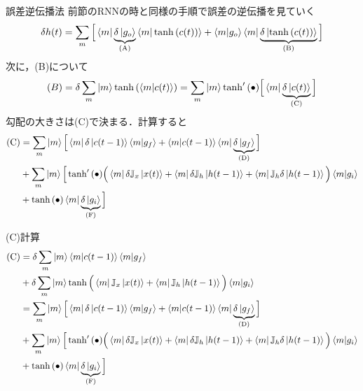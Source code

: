 \documentclass[dvipdfmx,8pt]{beamer}
\begin{document}
  \begin{frame}[t]{誤差逆伝播法}
    前節のRNNの時と同様の手順で誤差の逆伝播を見ていく\\
    \begin{equation*}
      \delta{h(t)} = \sum_{m}\Big[ \bra{m}\underbrace{\delta\ket{g_o}}_{\text{(A)}}\braket{m|\tanh{(c(t))}} + \braket{m|g_o}\bra{m}\underbrace{\delta \ket{\tanh{(c(t))}}}_{\text{(B)}} \Big]
    \end{equation*}
    次に，(B)について
    \begin{equation*}
      (B) = \delta\sum_{m}\ket{m}\tanh{(\braket{m|c(t)})} = \sum_{m}\ket{m}\tanh'{(\bullet)}\Big[ \bra{m}\underbrace{\delta\ket{c(t)}}_{\text{(C)}}  \Big]
    \end{equation*}
    勾配の大きさは(C)で決まる．計算すると
    \begin{align*}
      \text{(C)} 
      &= \sum_{m} \ket{m} \Big[ \bra{m}\delta\ket{c(t-1)}\braket{m|g_f} + \braket{m|c(t-1)}\bra{m}\underbrace{\delta\ket{g_f}}_{\text{(D)}} \Big]\\
      &+ \sum_{m} \ket{m}\Big[ \tanh'{(\bullet)}\Big( \bra{m}\delta\mathbb{J}_x\ket{x(t)} + \bra{m}\delta\mathbb{J}_h\ket{h(t-1)} + \bra{m}\mathbb{J}_h \delta\ket{h(t-1)} \Big)\braket{m|g_i}\\
      &+ \tanh{(\bullet)}\bra{m}\underbrace{\delta\ket{g_i}}_{\text{(F)}} \Big]
    \end{align*}
  \end{frame}

  \begin{frame}{(C)計算}
    \begin{align*}
      \text{(C)} 
      &= \delta\sum_{m}\ket{m}\braket{m|c(t-1)}\braket{m|g_f}\\
      &+ \delta\sum_m \ket{m}\tanh{\Big( \bra{m}\mathbb{J}_x \ket{x(t)} + \bra{m}\mathbb{J}_h \ket{h(t-1)} \Big)}\braket{m|g_i}\\ 
      &= \sum_{m} \ket{m} \Big[ \bra{m}\delta\ket{c(t-1)}\braket{m|g_f} + \braket{m|c(t-1)}\bra{m}\underbrace{\delta\ket{g_f}}_{\text{(D)}} \Big]\\
      &+ \sum_{m} \ket{m}\Big[ \tanh'{(\bullet)}\Big( \bra{m}\delta\mathbb{J}_x\ket{x(t)} + \bra{m}\delta\mathbb{J}_h\ket{h(t-1)} + \bra{m}\mathbb{J}_h \delta\ket{h(t-1)} \Big)\braket{m|g_i}\\
      &+ \tanh{(\bullet)}\bra{m}\underbrace{\delta\ket{g_i}}_{\text{(F)}} \Big]
    \end{align*}
    
  \end{frame}
\end{document}
